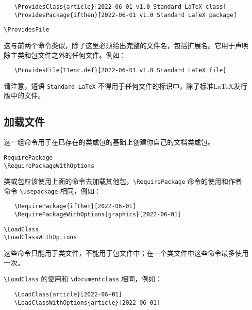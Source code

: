 \documentclass[12pt]{ltxguide}
\begin{document}
\begin{verbatim}
   \ProvidesClass{article}[2022-06-01 v1.0 Standard LaTeX class]
   \ProvidesPackage{ifthen}[2022-06-01 v1.0 Standard LaTeX package]
\end{verbatim}

\begin{decl}
  \verb|\ProvidesFile|  
\end{decl}
这与前两个命令类似，除了这里必须给出完整的文件名，包括扩展名。它用于声明除主类和包文件之外的任何文件。例如：

\begin{verbatim}
   \ProvidesFile{T1enc.def}[2022-06-01 v1.0 Standard LaTeX file]
\end{verbatim}

请注意，短语 \texttt{Standard LaTeX} 不得用于任何文件的标识中，除了标准\LaTeX{}发行版中的文件。
%
\subsection{加载文件}\label{sec:4.2}
这一组命令用于在已存在的类或包的基础上创建你自己的文档类或包。
\begin{decl}
  \verb|RequirePackage|  
     \\
  \verb|\RequirePackageWithOptions| 
\end{decl}
类或包应该使用上面的命令去加载其他包，\verb|\RequirePackage| 命令的使用和作者命令 \verb|\usepackage| 相同，例如：
\begin{verbatim}
   \RequirePackage{ifthen}[2022-06-01]
   \RequirePackageWithOptions{graphics}[2022-06-01]
\end{verbatim}

\begin{decl}
  \verb|\LoadClass|  
     \\
  \verb|\LoadClassWithOptions| 
\end{decl}

这些命令只能用于类文件，不能用于包文件中；在一个类文件中这些命令最多使用一次。

\verb|\LoadClass| 的使用和 \verb|\documentclass| 相同，例如：

\begin{verbatim}
   \LoadClass{article}[2022-06-01]
   \LoadClassWithOptions{article}[2022-06-01]
\end{verbatim}
\end{document}
